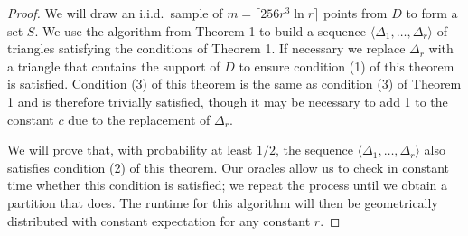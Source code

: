 \documentclass{patmorin}
\begin{document}
\begin{proof}
We will draw an i.i.d.\ sample of $m = \lceil 256r^3\ln r \rceil$
points from $D$ to form a set $S$.  We use the algorithm from Theorem
1 to build a sequence $\langle \Delta_1, \ldots, \Delta_r \rangle$
of triangles satisfying the conditions of Theorem 1.  If necessary we
replace $\Delta_r$ with a triangle that contains the support of $D$
to ensure condition (1) of this theorem is satisfied.  Condition (3) of
this theorem is the same as condition (3) of Theorem 1 and is therefore
trivially satisfied, though it may be necessary to add 1 to the constant
$c$ due to the replacement of $\Delta_r$.

We will prove that, with probability at least $1/2$, the sequence
$\langle \Delta_1, \ldots, \Delta_r \rangle$ also satisfies condition
(2) of this theorem.  Our oracles allow us to check in constant time
whether this condition is satisfied; we repeat the process until we
obtain a partition that does.  The runtime for this algorithm will then be
geometrically distributed with constant expectation for any constant $r$.


\end{proof}
\end{document}
